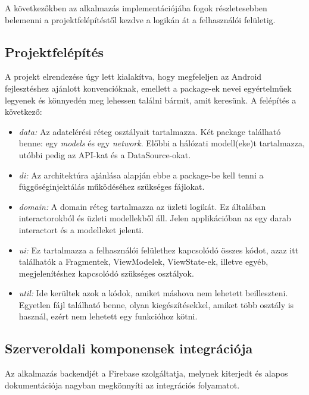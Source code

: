 A következőkben az alkalmazás implementációjába fogok részletesebben belemenni a projektfelépítéstől kezdve a logikán át a felhasználói felületig.

\subsection{Projektfelépítés}
A projekt elrendezése úgy lett kialakítva, hogy megfeleljen az Android fejlesztéshez ajánlott konvencióknak, emellett a package-ek nevei egyértelműek legyenek és könnyedén meg lehessen találni bármit, amit keresünk. A felépítés a következő:
\begin{itemize}
	\item \emph{data:} Az adatelérési réteg osztályait tartalmazza. Két package található benne: egy \emph{models} és egy \emph{network}. Előbbi a hálózati modell(eke)t tartalmazza, utóbbi pedig az API-kat és a DataSource-okat.
	\item \emph{di:} Az architektúra ajánlása alapján ebbe a package-be kell tenni a függőséginjektálás működéséhez szükséges fájlokat.
	\item \emph{domain:} A domain réteg tartalmazza az üzleti logikát. Ez általában interactorokból és üzleti modellekből áll. Jelen applikációban az egy darab interactort és a modelleket jelenti.
	\item \emph{ui:} Ez tartalmazza a felhasználói felülethez kapcsolódó összes kódot, azaz itt találhatók a Fragmentek, ViewModelek, ViewState-ek, illetve egyéb, megjelenítéshez kapcsolódó szükséges osztályok.
	\item \emph{util:} Ide kerültek azok a kódok, amiket máshova nem lehetett beilleszteni. Egyetlen fájl található benne, olyan kiegészítésekkel, amiket több osztály is használ, ezért nem lehetett egy funkcióhoz kötni.
\end{itemize}

\subsection{Szerveroldali komponensek integrációja}
Az alkalmazás backendjét a Firebase szolgáltatja, melynek kiterjedt és alapos dokumentációja nagyban megkönnyíti az integrációs folyamatot.

